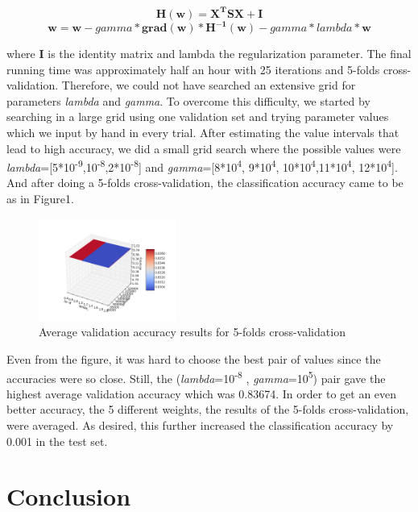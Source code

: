 \documentclass[journal]{IEEEtran}
\begin{document}
\begin{equation}
\mathbf{H(w)=X^{T}SX+I} 
\end{equation}
\begin{equation}
\mathbf{w}=\mathbf{w}-gamma*\mathbf{grad(w)}*\mathbf{H^{-1}(w)}-gamma*lambda*\mathbf{w}
\end{equation}

where \textbf{I} is the identity matrix and lambda the regularization parameter. The final running time was approximately half an hour with 25 iterations and 5-folds cross-validation. Therefore, we could not have searched an extensive grid for parameters \textit{lambda} and \textit{gamma}. To overcome this difficulty, we started by searching in a large grid using one validation set and trying parameter values which we input by hand in every trial. After estimating the value intervals that lead to high accuracy, we did a small grid search where the possible values were \textit{lambda}=[5*10\textsuperscript{-9},10\textsuperscript{-8},2*10\textsuperscript{-8}] and \textit{gamma}=[8*10\textsuperscript{4}, 9*10\textsuperscript{4}, 10*10\textsuperscript{4},11*10\textsuperscript{4}, 12*10\textsuperscript{4}]. And after doing a 5-folds cross-validation, the classification accuracy came to be as in Figure1.

\begin{figure}[h]
\includegraphics[width=0.4\textwidth]{figure_1.png}
\caption{Average validation accuracy results for 5-folds cross-validation}
\end{figure}



Even from the figure, it was hard to choose the best pair of values since the accuracies were so close. Still, the (\textit{lambda}=10\textsuperscript{-8}  , \textit{gamma}=10\textsuperscript{5}) pair gave the highest average validation accuracy which was 0.83674. In order to get an even better accuracy, the 5 different weights, the results of the 5-folds cross-validation, were averaged. As desired, this further increased the classification accuracy by 0.001 in the test set.


\section{Conclusion}
\end{document}
